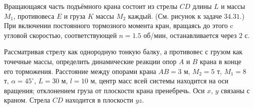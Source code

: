 Вращающаяся часть подъёмного крана состоит из стрелы $CD$ длины $L$
и массы $M_1$, противовеса $E$ и груза $K$ массы $M_2$ каждый.
(См. рисунок к задаче $34.31$.)
При включении постоянного тормозного момента кран,
вращаясь до этого c угловой скоростью, соответствующей $n = 1.5$ об/мин,
останавливается через $2$ с.

Рассматривая стрелу как однородную тонкую балку, а противовес с грузом
как точечные массы, определить динамические реакции опор $A$ и $B$
крана в конце его торможения.
Расстояние между опорами крана $AB = 3$ м, $M_2 = 5$ т, $M_1 = 8$ т,
$\alpha = 45^{\circ}$, $L = 30$ м, $l = 10$ м,
центр масс всей системы находится на оси вращения;
отклонением груза от плоскости крана пренебречь.
Оси $x$, $y$ связаны с краном.
Стрела $CD$ находится в плоскости $yz$.
